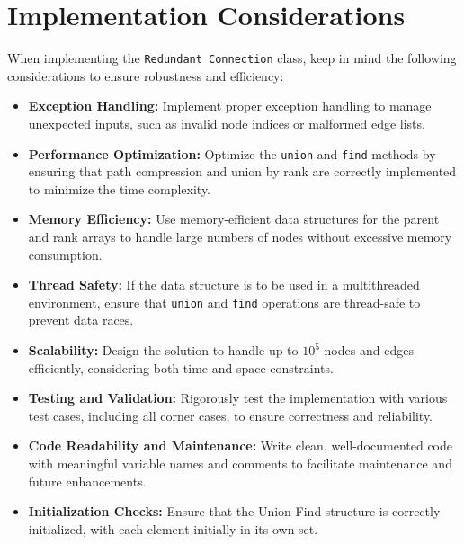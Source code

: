 \section*{Implementation Considerations}

When implementing the \texttt{Redundant Connection} class, keep in mind the following considerations to ensure robustness and efficiency:

\begin{itemize}
    \item \textbf{Exception Handling:}  
    Implement proper exception handling to manage unexpected inputs, such as invalid node indices or malformed edge lists.
    
    \item \textbf{Performance Optimization:}  
    Optimize the \texttt{union} and \texttt{find} methods by ensuring that path compression and union by rank are correctly implemented to minimize the time complexity.
    
    \item \textbf{Memory Efficiency:}  
    Use memory-efficient data structures for the parent and rank arrays to handle large numbers of nodes without excessive memory consumption.
    
    \item \textbf{Thread Safety:}  
    If the data structure is to be used in a multithreaded environment, ensure that \texttt{union} and \texttt{find} operations are thread-safe to prevent data races.
    
    \item \textbf{Scalability:}  
    Design the solution to handle up to \(10^5\) nodes and edges efficiently, considering both time and space constraints.
    
    \item \textbf{Testing and Validation:}  
    Rigorously test the implementation with various test cases, including all corner cases, to ensure correctness and reliability.
    
    \item \textbf{Code Readability and Maintenance:} 
    Write clean, well-documented code with meaningful variable names and comments to facilitate maintenance and future enhancements.
    
    \item \textbf{Initialization Checks:}  
    Ensure that the Union-Find structure is correctly initialized, with each element initially in its own set.
\end{itemize}

